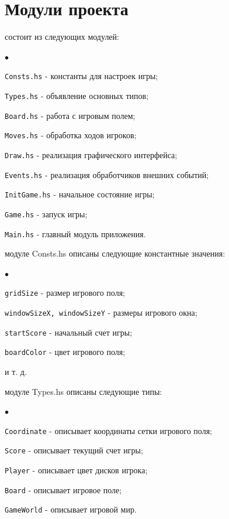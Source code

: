 \documentclass[oneside,final,14pt]{extreport}
\newenvironment{compactlist}{
    \begin{list}
    {{$\bullet$}}
    {
        \setlength\partopsep{0pt}
        \setlength\parskip{0pt}
        \setlength\parsep{5pt}
        \setlength\topsep{5pt}
        \setlength\itemsep{0pt}                        
    }
}{
    \end{list}
}
\begin{document}
\section {Модули проекта}
 состоит из следующих модулей:
\begin{compactlist}
    \item {\tt Consts.hs} - константы для настроек игры;
    \item {\tt Types.hs} - объявление основных типов;
    \item {\tt Board.hs} - работа с игровым полем;
    \item {\tt Moves.hs} - обработка ходов игроков;
    \item {\tt Draw.hs} - реализация графического интерфейса;
    \item {\tt Events.hs} - реализация обработчиков внешних событий;
    \item {\tt InitGame.hs} - начальное состояние игры;
    \item {\tt Game.hs} - запуск игры;
    \item {\tt Main.hs} - главный модуль приложения.
\end{compactlist}
\vspace{3mm}
 модуле Consts.hs описаны следующие константные значения:
\begin{compactlist}
    \item {\tt gridSize} - размер игрового поля;
    \item {\tt windowSizeX, windowSizeY} - размеры игрового окна;
    \item {\tt startScore} - начальный счет игры;
    \item {\tt boardColor} - цвет игрового поля;
    \item и т. д.
\end{compactlist}
\vspace{2mm}
 модуле Types.hs описаны следующие типы:
\begin{compactlist}
    \item {\tt Coordinate} - описывает координаты сетки игрового поля;
    \item {\tt Score} - описывает текущий счет игры;
    \item {\tt Player} - описывает цвет дисков игрока;
    \item {\tt Board} - описывает игровое поле;
    \item {\tt GameWorld} - описывает игровой мир.
\end{compactlist}
\vspace{2mm}
\end{document}
